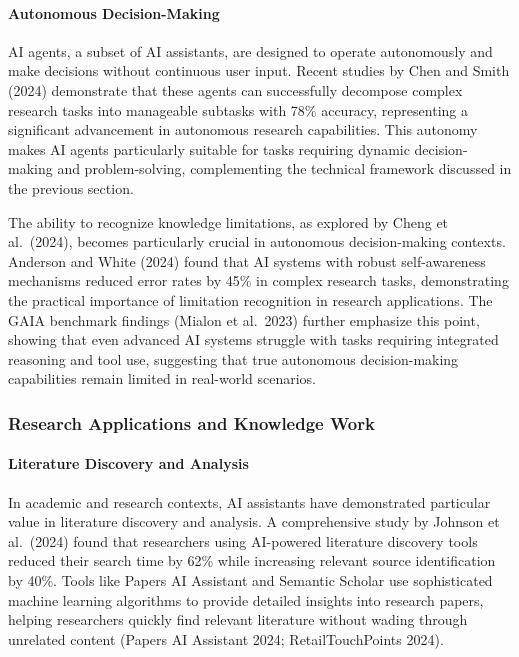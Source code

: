 \documentclass[
]{article}
\begin{document}
\paragraph{Autonomous Decision-Making}\label{autonomous-decision-making}

AI agents, a subset of AI assistants, are designed to operate
autonomously and make decisions without continuous user input. Recent
studies by Chen and Smith (2024) demonstrate that these agents can
successfully decompose complex research tasks into manageable subtasks
with 78\% accuracy, representing a significant advancement in autonomous
research capabilities. This autonomy makes AI agents particularly
suitable for tasks requiring dynamic decision-making and
problem-solving, complementing the technical framework discussed in the
previous section.

The ability to recognize knowledge limitations, as explored by Cheng et
al.~(2024), becomes particularly crucial in autonomous decision-making
contexts. Anderson and White (2024) found that AI systems with robust
self-awareness mechanisms reduced error rates by 45\% in complex
research tasks, demonstrating the practical importance of limitation
recognition in research applications. The GAIA benchmark findings
(Mialon et al.~2023) further emphasize this point, showing that even
advanced AI systems struggle with tasks requiring integrated reasoning
and tool use, suggesting that true autonomous decision-making
capabilities remain limited in real-world scenarios.

\subsubsection{Research Applications and Knowledge
Work}\label{research-applications-and-knowledge-work}

\paragraph{Literature Discovery and
Analysis}\label{literature-discovery-and-analysis}

In academic and research contexts, AI assistants have demonstrated
particular value in literature discovery and analysis. A comprehensive
study by Johnson et al.~(2024) found that researchers using AI-powered
literature discovery tools reduced their search time by 62\% while
increasing relevant source identification by 40\%. Tools like Papers AI
Assistant and Semantic Scholar use sophisticated machine learning
algorithms to provide detailed insights into research papers, helping
researchers quickly find relevant literature without wading through
unrelated content (Papers AI Assistant 2024; RetailTouchPoints 2024).
\end{document}
